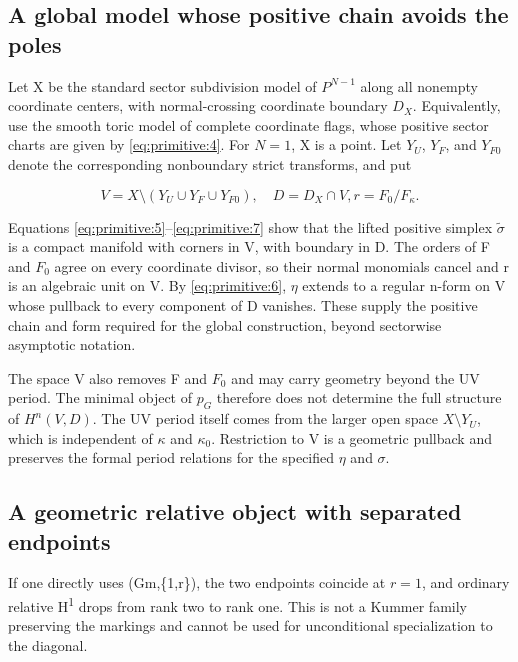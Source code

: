 \documentclass[11pt,a4paper,oneside]{article}
\theoremstyle{plain}
\theoremstyle{definition}
\theoremstyle{remark}
\numberwithin{equation}{section}
\begin{document}
\subsection{A global model whose positive chain avoids the poles}\label{sec:primitive:3}

Let X be the standard sector subdivision model of \(P^{N- 1}\) along all nonempty coordinate centers, with normal-crossing coordinate boundary \(D_X\). Equivalently, use the smooth toric model of complete coordinate flags, whose positive sector charts are given by \eqref{eq:primitive:4}. For \(N=1\), X is a point. Let \(Y_U\), \(Y_F\), and \(Y_{F0}\) denote the corresponding nonboundary strict transforms, and put

\begin{equation}
V=X\setminus(Y_U\cup Y_F\cup Y_{F0}),\quad D=D_X\cap V,
                         r=F_0/F_\kappa.                         \label{eq:primitive:9}
\end{equation}

Equations \eqref{eq:primitive:5}--\eqref{eq:primitive:7} show that the lifted positive simplex \(\widetilde\sigma\) is a compact manifold with corners in V, with boundary in D. The orders of F and \(F_0\) agree on every coordinate divisor, so their normal monomials cancel and r is an algebraic unit on V. By \eqref{eq:primitive:6}, \(\eta \) extends to a regular n-form on V whose pullback to every component of D vanishes. These supply the positive chain and form required for the global construction, beyond sectorwise asymptotic notation.

The space V also removes F and \(F_0\) and may carry geometry beyond the UV period. The minimal object of \(p_G\) therefore does not determine the full structure of \(H^n(V,D)\). The UV period itself comes from the larger open space \(X\setminus Y_U\), which is independent of \(\kappa \) and \(\kappa _0\). Restriction to V is a geometric pullback and preserves the formal period relations for the specified \(\eta \) and \(\sigma \).


\subsection{A geometric relative object with separated endpoints}\label{sec:primitive:4}

If one directly uses (Gm,\{1,r\}), the two endpoints coincide at \(r=1\), and ordinary relative H\textsuperscript{1} drops from rank two to rank one. This is not a Kummer family preserving the markings and cannot be used for unconditional specialization to the diagonal.
\end{document}
